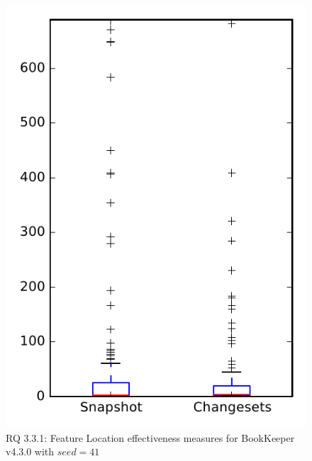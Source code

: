 
\begin{figure}
\centering
\includegraphics[height=0.4\textheight]{figures/flt_seed/rq1_bookkeeper_41}
\caption{RQ 3.3.1: Feature Location effectiveness measures for BookKeeper v4.3.0 with $seed=41$}
\label{fig:flt_seed:rq1:bookkeeper}
\end{figure}
